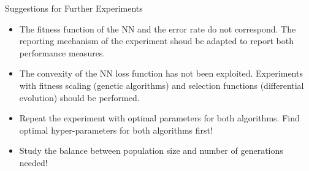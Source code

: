 \begin{frame}
\vspace*{2mm}
\begin{block}{
Suggestions for Further Experiments
}
\begin{itemize}
\item The fitness function of the NN and the error rate do not correspond.
       The reporting mechanism of the experiment shoud be adapted to report both performance measures.
\item The convexity of the NN loss function has not been exploited.
       Experiments with fitness scaling (genetic algorithms)
       and selection functions (differential evolution) should be performed.
\item Repeat the experiment with optimal parameters for both algorithms.
       Find optimal hyper-parameters for both algorithms first!
\item Study the balance between population size and number of generations needed!
\end{itemize}
\end{block}
\end{frame}